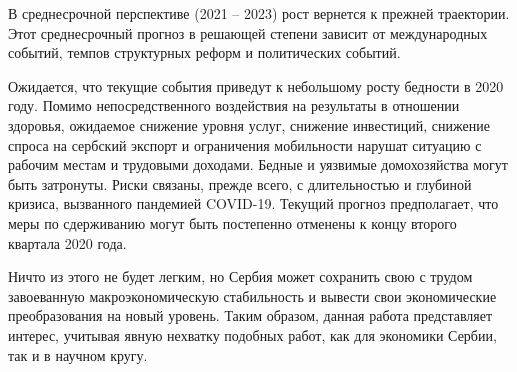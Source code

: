 В среднесрочной перспективе (2021 -- 2023) рост вернется к прежней траектории.
Этот среднесрочный прогноз в решающей степени зависит от международных событий, темпов структурных реформ и политических событий.

Ожидается, что текущие события приведут к небольшому росту бедности в 2020 году.
Помимо непосредственного воздействия на результаты в отношении здоровья, ожидаемое снижение уровня услуг, снижение инвестиций, снижение спроса на сербский экспорт и ограничения мобильности нарушат ситуацию с рабочим местам и трудовыми доходами.
Бедные и уязвимые домохозяйства могут быть затронуты.
Риски связаны, прежде всего, с длительностью и глубиной кризиса, вызванного пандемией COVID-19.
Текущий прогноз предполагает, что меры по сдерживанию могут быть постепенно отменены к концу второго квартала 2020 года.

Ничто из этого не будет легким, но Сербия может сохранить свою с трудом завоеванную макроэкономическую стабильность и вывести свои экономические преобразования на новый уровень.
Таким образом, данная работа представляет интерес, учитывая явную нехватку подобных работ, как для экономики Сербии, так и в научном кругу.
